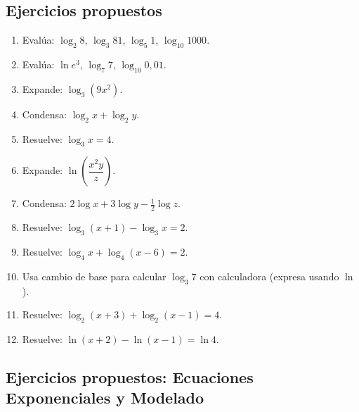 \documentclass[12pt, letterpaper]{article}
\begin{document}
\subsection{Ejercicios propuestos}

\begin{enumerate}[resume=ejercicios, leftmargin=*]
  \item \facil{} Evalúa: $\log_2 8$, $\log_3 81$, $\log_5 1$, $\log_{10} 1000$.
  \item \facil{} Evalúa: $\ln e^3$, $\log_7 7$, $\log_{10} 0{,}01$.
  \item \facil{} Expande: $\log_3(9x^2)$.
  \item \facil{} Condensa: $\log_2 x + \log_2 y$.
  \item \facil{} Resuelve: $\log_3 x = 4$.
  \item \medio{} Expande: $\ln\left(\dfrac{x^2 y}{z}\right)$.
  \item \medio{} Condensa: $2\log x + 3\log y - \frac{1}{2}\log z$.
  \item \medio{} Resuelve: $\log_3(x + 1) - \log_3 x = 2$.
  \item \medio{} Resuelve: $\log_4 x + \log_4(x - 6) = 2$.
  \item \medio{} Usa cambio de base para calcular $\log_3 7$ con calculadora (expresa usando $\ln$).
  \item \dificil{} Resuelve: $\log_2(x + 3) + \log_2(x - 1) = 4$.
  \item \dificil{} Resuelve: $\ln(x + 2) - \ln(x - 1) = \ln 4$.
\end{enumerate}


\subsection{Ejercicios propuestos: Ecuaciones Exponenciales y Modelado}
\end{document}
